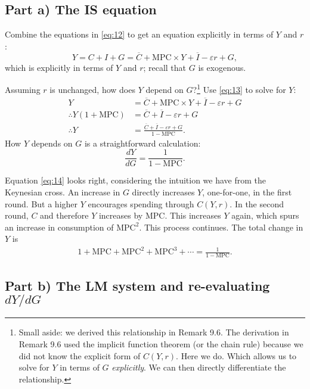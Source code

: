 \documentclass[12pt]{pracjourn_rwr}
\theoremstyle{definition}
\theoremstyle{remark}
\begin{document}
\subsection{Part a) The IS equation}

Combine the equations in \eqref{eq:12} to get an equation explicitly in terms of $Y$ and $r$:
\begin{equation}
\label{eq:13}
Y = C + I + G = \overline{C} + \text{MPC} \times Y + \overline{I} - \varepsilon r + G,
\end{equation}
which is explicitly in terms of $Y$ and $r$; recall that $G$ is exogenous.

Assuming $r$ is unchanged, how does $Y$ depend on $G$?\footnote{Small aside: we derived this relationship in Remark 9.6.
  The derivation in Remark 9.6 used the implicit function theorem (or the chain rule) because we did not know the explicit form of $C(Y,r)$.
  Here we do.
  Which allows us to solve for $Y$ in terms of $G$ \textit{explicitly}.
  We can then directly differentiate the relationship.}
Use \eqref{eq:13} to solve for $Y$:
\begin{align*}
Y &= \overline{C} + \text{MPC} \times Y + \overline{I} - \varepsilon r + G \\
\therefore Y \left( 1+ \text{MPC} \right) &= \overline{C} + \overline{I} - \varepsilon r + G \\
\therefore Y &= \frac{\overline{C} + \overline{I} - \varepsilon r + G}{1-\text{MPC}}.
\end{align*}
How $Y$ depends on $G$ is a straightforward calculation:
\begin{equation}
\label{eq:14}
\frac{d Y}{d G} = \frac{1}{1-\text{MPC}}.
\end{equation}

Equation \eqref{eq:14} looks right, considering the intuition we have from the Keynesian cross.
An increase in $G$ directly increases $Y$, one-for-one, in the first round.
But a higher $Y$ encourages spending through $C(Y,r)$.
In the second round, $C$ and therefore $Y$ increases by $\text{MPC}$.
This increases $Y$ again, which spurs an increase in consumption of $\text{MPC}^{2}$.
This process continues.
The total change in $Y$ is
\begin{align*}
1 + \text{MPC} + \text{MPC}^{2} + \text{MPC}^{3} + \cdots = \frac{1}{1-\text{MPC}}.
\end{align*}

\subsection{Part b) The LM system and re-evaluating $dY / dG$}
\end{document}
